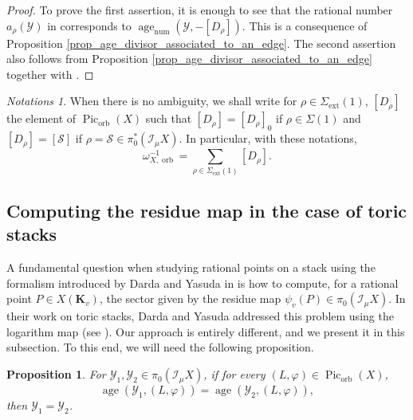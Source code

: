 \documentclass{proc-l}
\newcommand{\K}{\mathbf{K}}
\DeclareMathOperator{\Pic}{Pic}
\DeclareMathOperator{\num}{num}
\DeclareMathOperator{\age}{age}
\DeclareMathOperator{\orb}{orb}
\DeclareMathOperator{\ext}{ext}
\newcommand{\stackY}{\mathcal{Y}}
\newcommand{\stackS}{\mathcal{S}}
\newcommand{\sheafI}{\mathcal{I}}
\newcommand{\w}{\omega}
\newcommand{\sector}{\pi_0(\sheafI_{\mu} X)}
\newcommand{\twistsector}{\pi_0^*(\sheafI_{\mu} X)}
\newtheorem{prop}[theorem]{Proposition}
\theoremstyle{definition}
\theoremstyle{remark}
\newtheorem{remark}[theorem]{Remark}
\newtheorem{Notations}[theorem]{Notations}
\numberwithin{equation}{section}
\begin{document}
\begin{proof}
    To prove the first assertion, it is enough to see that the rational number $a_{\rho}(\stackY)$ in \cite[Theorem 1.1]{darda2025orbifoldpseudoeffectiveconestoric} corresponds to $\age_{\num}(\stackY,-[D_{\rho}])$. This is a consequence of Proposition \ref{prop_age_divisor_associated_to_an_edge}.  The second assertion also follows from Proposition \ref{prop_age_divisor_associated_to_an_edge} together with \cite[Lemma 3.3.7 (2)]{darda_yasuda_toric_stacks_batyrev}.
\end{proof}

\begin{Notations}\label{notation_class_orbifold_picard_group}
When there is no ambiguity, we shall write for $\rho \in \Sigma_{\ext}(1)$,  $[D_{\rho}]$ the element of $\Pic_{\orb}(X)$ such that $[D_{\rho}] = [D_{\rho}]_{0}$ if $\rho \in \Sigma(1)$ and $[D_{\rho}] = [\stackS] $ if $\rho = \stackS \in \twistsector$. In particular, with these notations, 
$$\w_{X,\orb}^{-1} = \sum\limits_{\rho \in \Sigma_{\ext}(1)} [D_{\rho}] .$$
\end{Notations}


   

\subsection{Computing the residue map in the case of toric stacks}



A fundamental question when studying rational points on a stack using the formalism
introduced by Darda and Yasuda in \cite{darda2024batyrevmanin} is how to compute, for a
rational point $P \in X(\K_v)$, the sector given by the residue map
$\psi_v(P) \in \sector$. In their work on toric stacks, Darda and Yasuda addressed this
problem using the logarithm map (see \cite[Lemma~3.1.6]{darda_yasuda_toric_stacks_batyrev}).
Our approach is entirely different, and we present it in this subsection. To this end,
we will need the following proposition.


\begin{prop}\label{corollary_sectors_dual_picard_group_toric_stacks}
For $\stackY_1, \stackY_2 \in \sector$, if for every $(L,\varphi) \in \Pic_{\orb}(X)$,
\[
\age(\stackY_1,(L,\varphi)) = \age(\stackY_2,(L,\varphi)),
\]
then $\stackY_1 = \stackY_2$. 

\end{prop}
\end{document}
